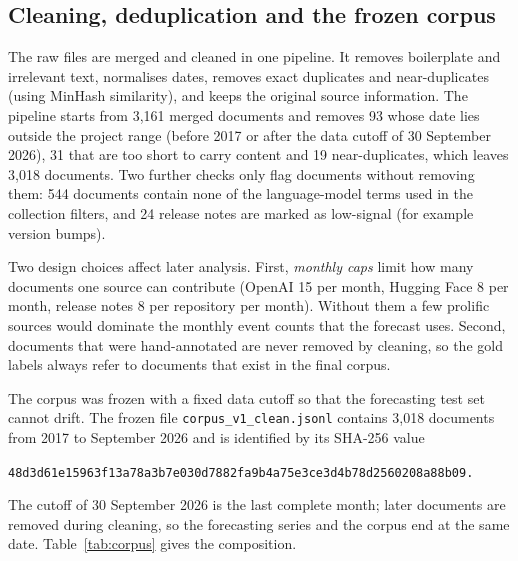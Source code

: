 \documentclass[11pt,a4paper]{article}
\newcommand{\code}[1]{\texttt{#1}}
\begin{document}
\subsection{Cleaning, deduplication and the frozen corpus}
\label{sec:cleaning}
The raw files are merged and cleaned in one pipeline. It removes boilerplate and irrelevant text, normalises
dates, removes exact duplicates and near-duplicates (using MinHash similarity), and keeps the original source
information. The pipeline starts from 3{,}161 merged documents and removes 93 whose date lies outside the
project range (before 2017 or after the data cutoff of 30 September 2026), 31 that are too short to carry
content and 19 near-duplicates, which leaves 3{,}018 documents. Two further checks only flag documents without
removing them: 544 documents contain none of the language-model terms used in the collection filters, and 24
release notes are marked as low-signal (for example version bumps).

Two design choices affect later analysis. First, \emph{monthly caps} limit how many documents one source can
contribute (OpenAI 15 per month, Hugging Face 8 per month, release notes 8 per repository per month). Without
them a few prolific sources would dominate the monthly event counts that the forecast uses. Second, documents
that were hand-annotated are never removed by cleaning, so the gold labels always refer to documents that exist
in the final corpus.

The corpus was frozen with a fixed data cutoff so that the forecasting test set cannot drift. The frozen file
\code{corpus\_v1\_clean.jsonl} contains 3{,}018 documents from 2017 to September 2026 and is identified by its
SHA-256 value
\begin{center}\small\code{48d3d61e15963f13a78a3b7e030d7882fa9b4a75e3ce3d4b78d2560208a88b09.}\end{center}
The cutoff of 30 September 2026
is the last complete month; later documents are removed during cleaning, so the forecasting series and the
corpus end at the same date.
Table~\ref{tab:corpus} gives the composition.
\end{document}
